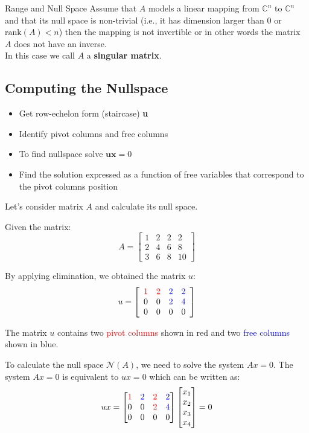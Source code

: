 \begin{definitionbox}{Range and Null Space}
Assume that \( A \) models a linear mapping from \( \mathbb{C}^n \) to \( \mathbb{C}^n \) and that its null space is non-trivial (i.e., it has dimension larger than 0 or \( \text{rank}(A) < n \)) then the mapping is not invertible or in other words the matrix \( A \) does not have an inverse.\\

In this case we call \( A \) a \textbf{singular matrix}.
    
\end{definitionbox}

\subsection{Computing the Nullspace}
\begin{itemize}
    \item Get row-echelon form (staircase) \textbf{u}
    \item Identify pivot columns and free columns
    \item To find nullspace solve $\textbf{ux} =0$
    \item Find the solution expressed as a function of free variables that correspond to the pivot columns position    
\end{itemize}

Let's consider matrix \( A \) and calculate its null space.

Given the matrix:
\[ A = \begin{bmatrix}
1 & 2 & 2 & 2 \\
2 & 4 & 6 & 8 \\
3 & 6 & 8 & 10
\end{bmatrix} \]

By applying elimination, we obtained the matrix \( u \):
\[ u = \left[ \begin{array}{cccc}
\color{red}1 & \color{red}2 & \color{blue}2 & \color{blue}2 \\
0 & 0 & \color{blue}2 & \color{blue}4 \\
0 & 0 & 0 & 0
\end{array} \right] \]

The matrix \( u \) contains two \textcolor{red}{pivot columns} shown in red and two \textcolor{blue}{free columns} shown in blue.

To calculate the null space \( \mathcal{N}(A) \), we need to solve the system \( Ax = 0 \). The system \( Ax = 0 \) is equivalent to \( ux = 0 \) which can be written as:
\[ ux = \begin{bmatrix}
\color{red}1 & \color{blue}2 & \color{red}2 & \color{blue}2 \\
0 & 0 & \color{red}2 & \color{blue}4 \\
0 & 0 & 0 & 0
\end{bmatrix}
\begin{bmatrix}
x_1 \\
x_2 \\
x_3 \\
x_4
\end{bmatrix} = 0 \]

